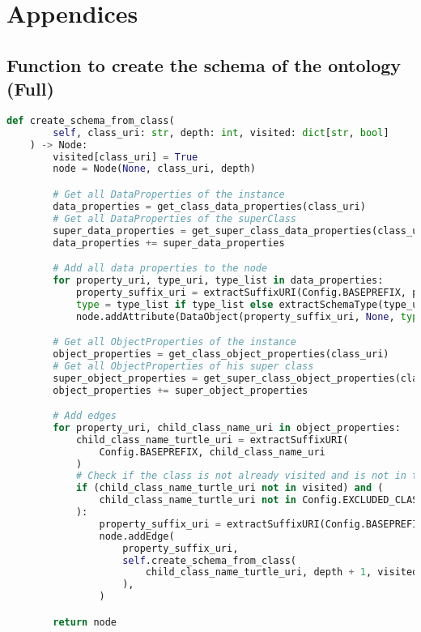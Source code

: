 \appendix

\section*{Appendices}
\renewcommand{\thesubsection}{\Alph{subsection}}

\label{annex:framework}

\subsection{Function to create the schema of the ontology (Full)\label{annex:create-schema-full}}

\begin{lstlisting}[language=Python, caption=Function to create the schema of the ontology (Full), label={lst:create-schema-full}]
def create_schema_from_class(
        self, class_uri: str, depth: int, visited: dict[str, bool]
    ) -> Node:
        visited[class_uri] = True
        node = Node(None, class_uri, depth)

        # Get all DataProperties of the instance
        data_properties = get_class_data_properties(class_uri)
        # Get all DataProperties of the superClass
        super_data_properties = get_super_class_data_properties(class_uri)
        data_properties += super_data_properties

        # Add all data properties to the node
        for property_uri, type_uri, type_list in data_properties:
            property_suffix_uri = extractSuffixURI(Config.BASEPREFIX, property_uri)
            type = type_list if type_list else extractSchemaType(type_uri)
            node.addAttribute(DataObject(property_suffix_uri, None, type, depth))

        # Get all ObjectProperties of the instance
        object_properties = get_class_object_properties(class_uri)
        # Get all ObjectProperties of his super class
        super_object_properties = get_super_class_object_properties(class_uri)
        object_properties += super_object_properties

        # Add edges
        for property_uri, child_class_name_uri in object_properties:
            child_class_name_turtle_uri = extractSuffixURI(
                Config.BASEPREFIX, child_class_name_uri
            )
            # Check if the class is not already visited and is not in the list of excluded classes
            if (child_class_name_turtle_uri not in visited) and (
                child_class_name_turtle_uri not in Config.EXCLUDED_CLASSES
            ):
                property_suffix_uri = extractSuffixURI(Config.BASEPREFIX, property_uri)
                node.addEdge(
                    property_suffix_uri,
                    self.create_schema_from_class(
                        child_class_name_turtle_uri, depth + 1, visited
                    ),
                )

        return node
\end{lstlisting}




